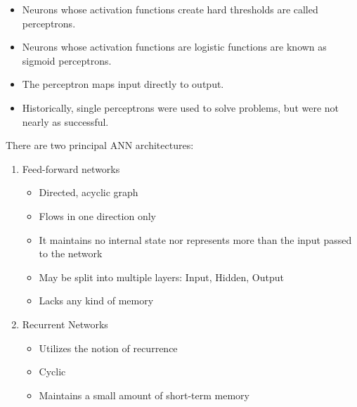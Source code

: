 \documentclass{beamer}
\begin{document}
\begin{frame}
\begin{itemize}
\item Neurons whose activation functions create hard thresholds are called perceptrons.  
\item Neurons whose activation functions are logistic functions are known as sigmoid perceptrons.
\item The perceptron maps input directly to output.
\item Historically, single perceptrons were used to solve problems, but were not nearly as successful.
\end{itemize}
\end{frame}

\begin{frame}
There are two principal ANN architectures:
\begin{enumerate}
\item Feed-forward networks
\begin{itemize}
\item Directed, acyclic graph
\item Flows in one direction only
\item It maintains no internal state nor represents more than the input passed to the network
\item May be split into multiple layers: Input, Hidden, Output
\item Lacks any kind of memory
\end{itemize}
\item Recurrent Networks
\begin{itemize}
\item Utilizes the notion of recurrence 
\item Cyclic
\item Maintains a small amount of short-term memory
\end{itemize}
\end{enumerate}

\end{frame}
\end{document}
